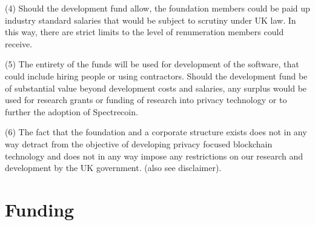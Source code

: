 (4) Should the development fund allow, the foundation members could be paid up industry standard salaries that would be subject to scrutiny under UK law. In this way, there are strict limits to the level of renumeration members could receive. 

(5) The entirety of the funds will be used for development of the software, that could include hiring people or using contractors. Should the development fund be of substantial value beyond development costs and salaries, any surplus would be used for research grants or funding of research into privacy technology or to further the adoption of Spectrecoin. 

(6) The fact that the foundation and a corporate structure exists does not in any way detract from the objective of developing privacy focused blockchain technology and does not in any way impose any restrictions on our research and development by the UK government. (also see disclaimer). 



\section{Funding}
